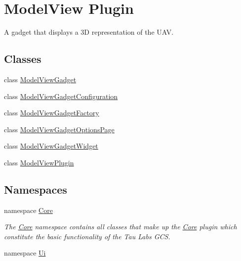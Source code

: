 \hypertarget{group___model_view_plugin}{\section{\-Model\-View \-Plugin}
\label{group___model_view_plugin}
}


\-A gadget that displays a 3\-D representation of the \-U\-A\-V.  


\subsection*{\-Classes}
\begin{DoxyCompactItemize}
\item 
class \hyperlink{class_model_view_gadget}{\-Model\-View\-Gadget}
\item 
class \hyperlink{class_model_view_gadget_configuration}{\-Model\-View\-Gadget\-Configuration}
\item 
class \hyperlink{class_model_view_gadget_factory}{\-Model\-View\-Gadget\-Factory}
\item 
class \hyperlink{class_model_view_gadget_options_page}{\-Model\-View\-Gadget\-Options\-Page}
\item 
class \hyperlink{class_model_view_gadget_widget}{\-Model\-View\-Gadget\-Widget}
\item 
class \hyperlink{class_model_view_plugin}{\-Model\-View\-Plugin}
\end{DoxyCompactItemize}
\subsection*{\-Namespaces}
\begin{DoxyCompactItemize}
\item 
namespace \hyperlink{namespace_core}{\-Core}
\begin{DoxyCompactList}\small\item\em \-The \hyperlink{namespace_core}{\-Core} namespace contains all classes that make up the \hyperlink{namespace_core}{\-Core} plugin which constitute the basic functionality of the \-Tau \-Labs \-G\-C\-S. \end{DoxyCompactList}\item 
namespace \hyperlink{namespace_ui}{\-Ui}
\end{DoxyCompactItemize}
